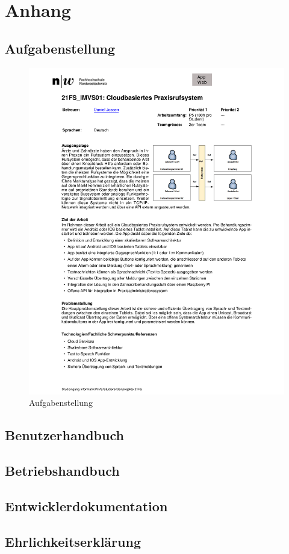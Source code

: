 
\renewcommand\refname{Literaturverzeichnis}
\printbibliography
\cleardoublepage
\listoffigures

\section{Anhang}
    \subsection{Aufgabenstellung}
        \begin{figure}[h]
            \centering
            \begin{minipage}[b]{0.8\textwidth}
                \includegraphics[width=\textwidth]{graphics/aufgabenstellung}
                \caption{Aufgabenstellung}
            \end{minipage}
        \end{figure}

    \subsection{Benutzerhandbuch}
    \subsection{Betriebshandbuch}
    \subsection{Entwicklerdokumentation}
    \subsection{Ehrlichkeitserklärung}
